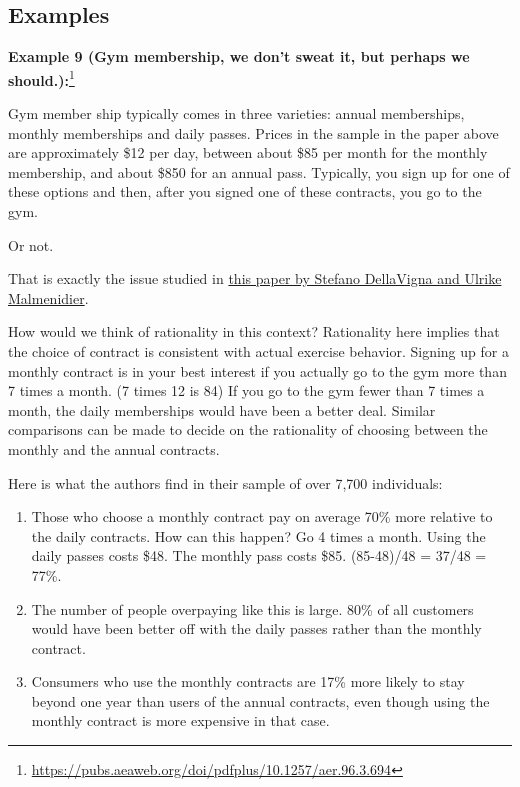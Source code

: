 \documentclass[
]{book}
\begin{document}
\hypertarget{examples-2}{%
\subsection{Examples}\label{examples-2}}

\textbf{Example 9 (Gym membership, we don't sweat it, but perhaps we should.):}\footnote{
  \url{https://pubs.aeaweb.org/doi/pdfplus/10.1257/aer.96.3.694}}

Gym member ship typically comes in three varieties: annual memberships, monthly memberships and daily passes. Prices in the sample in the paper above are approximately \$12 per day, between about \$85 per month for the monthly membership, and about \$850 for an annual pass. Typically, you sign up for one of these options and then, after you signed one of these contracts, you go to the gym.

Or not.

That is exactly the issue studied in \href{https://pubs.aeaweb.org/doi/pdfplus/10.1257/aer.96.3.694}{this paper by Stefano DellaVigna and Ulrike Malmenidier}.

How would we think of rationality in this context? Rationality here implies that the choice of contract is consistent with actual exercise behavior. Signing up for a monthly contract is in your best interest if you actually go to the gym more than 7 times a month. (7 times 12 is 84) If you go to the gym fewer than 7 times a month, the daily memberships would have been a better deal. Similar comparisons can be made to decide on the rationality of choosing between the monthly and the annual contracts.

Here is what the authors find in their sample of over 7,700 individuals:

\begin{enumerate}
\def\labelenumi{\arabic{enumi}.}
\item
  Those who choose a monthly contract pay on average 70\% more relative to the daily contracts. How can this happen? Go 4 times a month. Using the daily passes costs \$48. The monthly pass costs \$85. (85-48)/48 = 37/48 = 77\%.
\item
  The number of people overpaying like this is large. 80\% of all customers would have been better off with the daily passes rather than the monthly contract.
\item
  Consumers who use the monthly contracts are 17\% more likely to stay beyond one year than users of the annual contracts, even though using the monthly contract is more expensive in that case.
\end{enumerate}
\end{document}
